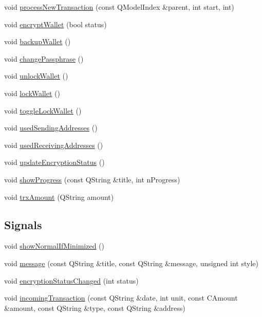 \begin{DoxyCompactItemize}
void \mbox{\hyperlink{class_wallet_view_addde7d2260658ee06f47f9c095a8cb2a}{process\+New\+Transaction}} (const Q\+Model\+Index \&parent, int start, int)
\item 
void \mbox{\hyperlink{class_wallet_view_a164c3de8fc69ef6f39fb7c15e4bda553}{encrypt\+Wallet}} (bool status)
\item 
void \mbox{\hyperlink{class_wallet_view_a9800d793b552076b4207276d9e08c8b6}{backup\+Wallet}} ()
\item 
void \mbox{\hyperlink{class_wallet_view_a36699c31e256becb2afd92f834830ba0}{change\+Passphrase}} ()
\item 
void \mbox{\hyperlink{class_wallet_view_ac258d549f0e55ad4f84b9d21848faf02}{unlock\+Wallet}} ()
\item 
void \mbox{\hyperlink{class_wallet_view_ae76bd29c36d1cfa9bc986924a0454eeb}{lock\+Wallet}} ()
\item 
void \mbox{\hyperlink{class_wallet_view_a739b3c92d336efb3cf1249a84d4deeab}{toggle\+Lock\+Wallet}} ()
\item 
void \mbox{\hyperlink{class_wallet_view_a6f0d012c18ea2df7336c852abe2a50d0}{used\+Sending\+Addresses}} ()
\item 
void \mbox{\hyperlink{class_wallet_view_accb5d9e2789c62e03ad1723518d31c02}{used\+Receiving\+Addresses}} ()
\item 
void \mbox{\hyperlink{class_wallet_view_ad348f2ed9f843ef9125ca416307c7412}{update\+Encryption\+Status}} ()
\item 
void \mbox{\hyperlink{class_wallet_view_a8a1f4b689abc0f1073c547ec1f871a26}{show\+Progress}} (const Q\+String \&title, int n\+Progress)
\item 
void \mbox{\hyperlink{class_wallet_view_ac4206b008b9c16dd6931aa56d9fb6fd4}{trx\+Amount}} (Q\+String amount)
\end{DoxyCompactItemize}
\subsection*{Signals}
\begin{DoxyCompactItemize}
\item 
void \mbox{\hyperlink{class_wallet_view_aac71ea140f87cd60081b56e579b6fa0c}{show\+Normal\+If\+Minimized}} ()
\item 
void \mbox{\hyperlink{class_wallet_view_a901527bc1086ef5443a264af651de178}{message}} (const Q\+String \&title, const Q\+String \&message, unsigned int style)
\item 
void \mbox{\hyperlink{class_wallet_view_a98ed22bbde34c1e614e60ecd0b07f03b}{encryption\+Status\+Changed}} (int status)
\item 
void \mbox{\hyperlink{class_wallet_view_aa2348613d312c4c762d3e8100bd38067}{incoming\+Transaction}} (const Q\+String \&date, int unit, const C\+Amount \&amount, const Q\+String \&type, const Q\+String \&address)
\end{DoxyCompactItemize}
